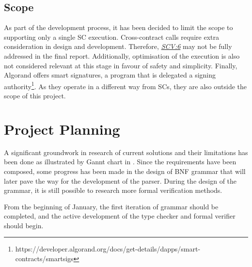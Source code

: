 \documentclass[oneside]{ecsproject}     %
\newcommand{\vref}[1]{\textit{\hyperref[#1]{#1}}}
\begin{document}
\section{Scope}

As part of the development process, it has been decided to limit the scope to supporting only a single SC execution.
Cross-contract calls require extra consideration in design and development. Therefore, \vref{SCV:6} may not be fully addressed in the final report.
Additionally, optimisation of the execution is also not considered relevant at this stage in favour of safety and simplicity.
Finally, Algorand offers smart signatures, a program that is delegated a signing authority\footnote{https://developer.algorand.org/docs/get-details/dapps/smart-contracts/smartsigs}.
As they operate in a different way from SCs, they are also outside the scope of this project.

\begingroup
\renewcommand{\cleardoublepage}{}
\renewcommand{\clearpage}{}
\chapter{Project Planning}
\endgroup

A significant groundwork in research of current solutions and their limitations has been done as illustrated by Gannt chart in .
Since the requirements have been composed, some progress has been made in the design of BNF grammar that will later pave the way for the development
of the parser. During the design of the grammar, it is still possible to research more formal verification methods.

From the beginning of January, the first iteration of grammar should be completed, and the active development of the type checker and formal verifier should begin.



\appendix
\end{document}
